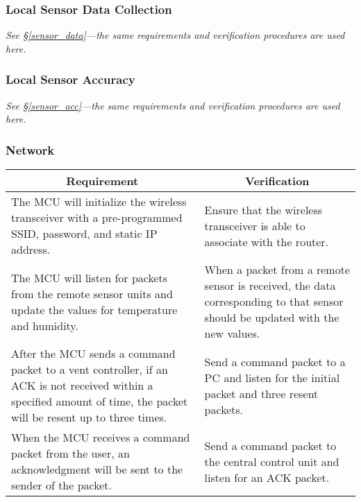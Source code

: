 \subsubsection{Local Sensor Data Collection}
{\em See \S \ref{sensor_data}---the same requirements and verification procedures are used here.}
\subsubsection{Local Sensor Accuracy}
{\em See \S \ref{sensor_acc}---the same requirements and verification procedures are used here.}

\subsubsection{Network}
\begin{tabular}{|p{\mytabwidth}|p{\mytabwidth}|}
\hline
\multicolumn{1}{|c|}{Requirement} & \multicolumn{1}{|c|}{Verification} \\
\hline\hline
The MCU will initialize the wireless transceiver with a pre-programmed SSID, password, and static IP address. &
Ensure that the wireless transceiver is able to associate with the router. \\
\hline
The MCU will listen for packets from the remote sensor units and update the values for temperature and humidity. &
When a packet from a remote sensor is received, the data corresponding to that sensor should be updated with the new values. \\
\hline
After the MCU sends a command packet to a vent controller, if an ACK is not received within a specified amount of time, the packet will be resent up to three times. &
Send a command packet to a PC and listen for the initial packet and three resent packets. \\
\hline
When the MCU receives a command packet from the user, an acknowledgment will be sent to the sender of the packet. &
Send a command packet to the central control unit and listen for an ACK packet. \\
\hline
\end{tabular}
